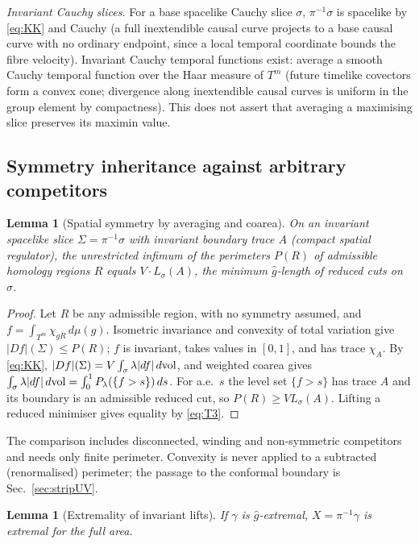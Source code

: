 \documentclass[aps,prd,onecolumn,superscriptaddress,nofootinbib,amsmath,amssymb,11pt]{revtex4-2}
\newtheorem{lemma}[theorem]{Lemma}
\theoremstyle{definition}
\begin{document}
\emph{Invariant Cauchy slices.} For a base spacelike Cauchy slice $\sigma$, $\pi^{-1}\sigma$ is spacelike by \eqref{eq:KK} and Cauchy (a
full inextendible causal curve projects to a base causal curve with no ordinary endpoint, since a local temporal coordinate
bounds the fibre velocity). Invariant Cauchy temporal functions exist: average a smooth Cauchy temporal function over the Haar
measure of $T^m$ (future timelike covectors form a convex cone; divergence along inextendible causal curves is uniform in the
group element by compactness). This does not assert that averaging a maximising slice preserves its maximin value.

\subsection{Symmetry inheritance against arbitrary competitors}\label{sec:stripsym}

\begin{lemma}[Spatial symmetry by averaging and coarea]\label{lem:BV}
On an invariant spacelike slice $\Sigma=\pi^{-1}\sigma$ with invariant boundary trace $A$ (compact spatial regulator), the
unrestricted infimum of the perimeters $P(R)$ of admissible homology regions $R$ equals $V\cdot L_\sigma(A)$, the minimum
$\widehat g$-length of reduced cuts on $\sigma$.
\end{lemma}

\begin{proof}
Let $R$ be any admissible region, with no symmetry assumed, and $f=\int_{T^m}\chi_{gR}\,d\mu(g)$. Isometric invariance and
convexity of total variation give $|Df|(\Sigma)\le P(R)$; $f$ is invariant, takes values in $[0,1]$, and has trace $\chi_A$. By
\eqref{eq:KK}, $|Df|(\Sigma)=V\int_\sigma\lambda|df|\,d{\rm vol}$, and weighted coarea gives
$\int_\sigma\lambda|df|\,d{\rm vol}=\int_0^1P_\lambda(\{f>s\})\,ds$. For a.e.\ $s$ the level set $\{f>s\}$ has trace $A$ and its boundary is an
admissible reduced cut, so $P(R)\ge VL_\sigma(A)$. Lifting a reduced minimiser gives equality by \eqref{eq:T3}.
\end{proof}

The comparison includes disconnected, winding and non-symmetric competitors and needs only finite perimeter. Convexity is
never applied to a subtracted (renormalised) perimeter; the passage to the conformal boundary is Sec.~\ref{sec:stripUV}.

\begin{lemma}[Extremality of invariant lifts]\label{lem:liftext}
If $\gamma$ is $\widehat g$-extremal, $X=\pi^{-1}\gamma$ is extremal for the full area.
\end{lemma}
\end{document}
